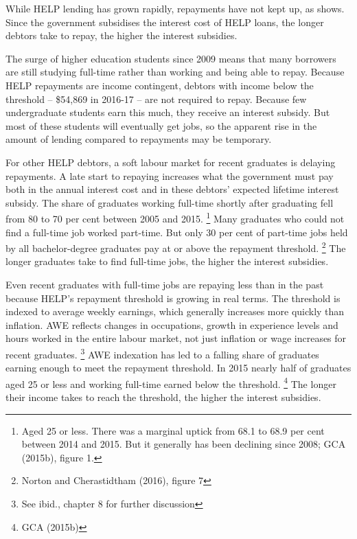 \documentclass[embargoed]{grattan}
\begin{document}
While \gls{HELP} lending has grown rapidly, repayments have not kept up, as  shows.
Since the government subsidises the interest cost of \gls{HELP} loans, the longer debtors take to repay, the higher the interest subsidies.

The surge of higher education students since 2009 means that many borrowers are still studying full-time rather than working and being able to repay.
Because \gls{HELP} repayments are income contingent, debtors with income below the threshold -- \$54,869 in 2016-17 -- are not required to repay.
Because few undergraduate students earn this much, they receive an interest subsidy.
But most of these students will eventually get jobs, so the apparent rise in the amount of lending compared to repayments may be temporary.

For other \gls{HELP} debtors, a soft labour market for recent graduates is delaying repayments.
A late start to repaying increases what the government must pay both in the annual interest cost and in these debtors' expected lifetime interest subsidy.
The share of graduates working full-time shortly after graduating fell from 80 to 70 per cent between 2005 and 2015.%
\footnote{Aged 25 or less.
There was a marginal uptick from 68.1 to 68.9 per cent between 2014 and 2015.
But it generally has been declining since 2008; GCA (2015b), figure 1.} Many graduates who could not find a full-time job worked part-time.
But only 30 per cent of part-time jobs held by all bachelor-degree graduates pay at or above the repayment threshold.%
\footnote{Norton and Cherastidtham (2016), figure 7} The longer graduates take to find full-time jobs, the higher the interest subsidies.

Even recent graduates with full-time jobs are repaying less than in the past because \gls{HELP}'s repayment threshold is growing in real terms.
The threshold is indexed to average weekly earnings, which generally increases more quickly than inflation.
\gls{AWE} reflects changes in occupations, growth in experience levels and hours worked in the entire labour market, not just inflation or wage increases for recent graduates.%
\footnote{See ibid., chapter 8 for further discussion} \gls{AWE} indexation has led to a falling share of graduates earning enough to meet the repayment threshold.
In 2015 nearly half of graduates aged 25 or less and working full-time earned below the threshold.%
\footnote{GCA (2015b)} The longer their income takes to reach the threshold, the higher the interest subsidies.
\end{document}
